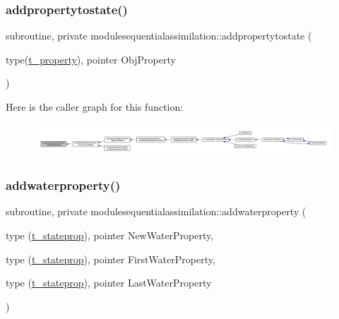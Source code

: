 \subsubsection{\texorpdfstring{addpropertytostate()}{addpropertytostate()}}
{\footnotesize\ttfamily subroutine, private modulesequentialassimilation\+::addpropertytostate (\begin{DoxyParamCaption}\item[{type(\mbox{\hyperlink{structmodulesequentialassimilation_1_1t__property}{t\+\_\+property}}), pointer}]{Obj\+Property }\end{DoxyParamCaption})\hspace{0.3cm}{\ttfamily [private]}}

Here is the caller graph for this function\+:\nopagebreak
\begin{figure}[H]
\begin{center}
\leavevmode
\includegraphics[width=350pt]{namespacemodulesequentialassimilation_a5cad8b44cf828f7b0f86fffd43e9f8a7_icgraph}
\end{center}
\end{figure}
\mbox{\label{namespacemodulesequentialassimilation_a891242d04c33e25fc2d6c1b0bbbcdb59}} 
\subsubsection{\texorpdfstring{addwaterproperty()}{addwaterproperty()}}
{\footnotesize\ttfamily subroutine, private modulesequentialassimilation\+::addwaterproperty (\begin{DoxyParamCaption}\item[{type (\mbox{\hyperlink{structmodulesequentialassimilation_1_1t__stateprop}{t\+\_\+stateprop}}), pointer}]{New\+Water\+Property,  }\item[{type (\mbox{\hyperlink{structmodulesequentialassimilation_1_1t__stateprop}{t\+\_\+stateprop}}), pointer}]{First\+Water\+Property,  }\item[{type (\mbox{\hyperlink{structmodulesequentialassimilation_1_1t__stateprop}{t\+\_\+stateprop}}), pointer}]{Last\+Water\+Property }\end{DoxyParamCaption})\hspace{0.3cm}{\ttfamily [private]}}

